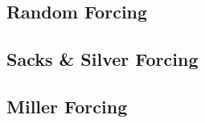 \documentclass{dcthesis}[]
\theoremstyle{definition}
\begin{document}
	\subsection{Random Forcing}\label{random}
		
	\subsection{Sacks \& Silver Forcing}\label{sacks}
		
	\subsection{Miller Forcing}\label{miller}
		


\backmatter




\printindex
\end{document}

